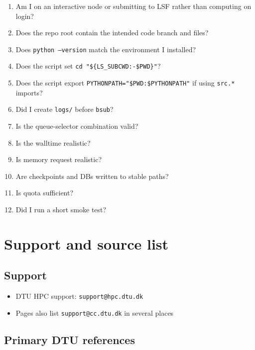 \documentclass[11pt,a4paper]{article}
\begin{document}
\begin{enumerate}[leftmargin=1.5em]
  \item Am I on an interactive node or submitting to LSF rather than computing on login?
  \item Does the repo root contain the intended code branch and files?
  \item Does \texttt{python --version} match the environment I installed?
  \item Does the script set \texttt{cd "\$\{LS\_SUBCWD:-\$PWD\}"}?
  \item Does the script export \texttt{PYTHONPATH="\$PWD:\$PYTHONPATH"} if using \texttt{src.*} imports?
  \item Did I create \texttt{logs/} before \texttt{bsub}?
  \item Is the queue-selector combination valid?
  \item Is the walltime realistic?
  \item Is memory request realistic?
  \item Are checkpoints and DBs written to stable paths?
  \item Is quota sufficient?
  \item Did I run a short smoke test?
\end{enumerate}

\section{Support and source list}

\subsection{Support}

\begin{itemize}[leftmargin=1.5em]
  \item DTU HPC support: \texttt{support@hpc.dtu.dk}
  \item Pages also list \texttt{support@cc.dtu.dk} in several places
\end{itemize}

\subsection{Primary DTU references}
\end{document}
